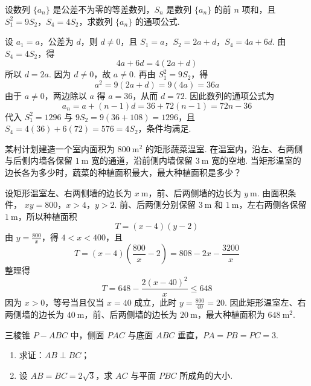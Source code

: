 \begin{problem}
设数列 \(\{a_{n}\}\) 是公差不为零的等差数列，\(S_n\) 是数列 \(\{a_{n}\}\) 的前 \(n\) 项和，且 \(S_{1}^{2} = 9S_2\)，\(S_4 = 4S_2\)，求数列 \(\{a_{n}\}\) 的通项公式.
\end{problem}

\begin{solution}
设 \(a_{1} = a\)，公差为 \(d\)，则 \(d \ne 0\)，且
\(S_1=a\)，\(S_2=2a+d\)，\(S_4=4a+6d\).
由 \(S_{4} = 4S_{2}\)，得
\[
4a + 6d = 4(2a + d)
\]
所以 \(d=2a\). 因为 \(d\ne0\)，故 \(a\ne0\). 再由 \(S_1^2=9S_2\)，得
\[
a^2=9(2a+d)=9(4a)=36a
\]
由于 \(a\ne0\)，两边除以 \(a\) 得 \(a=36\)，从而 \(d=72\). 因此数列的通项公式为
\[
a_n=a+(n-1)d=36+72(n-1)=72n-36
\]
代入 \(S_1^2=1296\) 与 \(9S_2=9(36+108)=1296\)，且 \(S_4=4(36)+6(72)=576=4S_2\)，条件均满足.
\end{solution}

\begin{problem}
某村计划建造一个室内面积为 \(800 \mathrm{~m}^{2}\) 的矩形蔬菜温室. 在温室内，沿左、右两侧与后侧内墙各保留 \(1 \mathrm{~m}\) 宽的通道，沿前侧内墙保留 \(3 \mathrm{~m}\) 宽的空地. 当矩形温室的边长各为多少时，蔬菜的种植面积最大，最大种植面积是多少？
\end{problem}

\begin{solution}
设矩形温室左、右两侧墙的边长为 \(x\mathrm{~m}\)，前、后两侧墙的边长为 \(y\mathrm{~m}\). 由面积条件，
\(xy=800\)，\(x>4\)，\(y>2\).
前、后两侧分别保留 \(3\mathrm{~m}\) 和 \(1\mathrm{~m}\)，左右两侧各保留 \(1\mathrm{~m}\)，所以种植面积
\[
T=(x-4)(y-2)
\]
由 \(y=\frac{800}{x}\)，得 \(4<x<400\)，且
\[
T=(x-4)\left(\frac{800}{x}-2\right)=808-2x-\frac{3200}{x}
\]
整理得
\[
T=648-\frac{2(x-40)^2}{x}\leqslant648
\]
因为 \(x>0\)，等号当且仅当 \(x=40\) 成立，此时 \(y=\frac{800}{40}=20\). 因此矩形温室左、右两侧墙的边长为 \(40\mathrm{~m}\)，前、后两侧墙的边长为 \(20\mathrm{~m}\)，最大种植面积为 \(648\mathrm{~m}^2\).
\end{solution}

\begin{problem}
三棱锥 \(P - ABC\) 中，侧面 \(PAC\) 与底面 \(ABC\) 垂直，\(PA = PB = PC = 3\).
\begin{enumerate}
\item 求证：\(AB \perp BC\)；
\item 设 \(AB = BC = 2\sqrt{3}\)，求 \(AC\) 与平面 \(PBC\) 所成角的大小.
\end{enumerate}

\end{problem}

